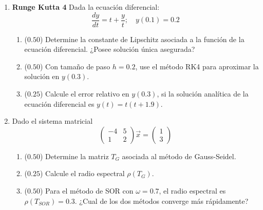 \documentclass[12pt]{article}
\begin{document}
  \begin{enumerate}[leftmargin=*,widest=9]
    \item \textbf{Runge Kutta 4} Dada la ecuación diferencial:
    \[
    \frac{dy}{dt} = t + \frac{y}{t}; \quad y(0.1)=0.2
    \]
    \begin{enumerate}[label=\alph*]
    \item ($0.50$) Determine la constante de Lipschitz asociada a la función de la ecuación diferencial. ¿Posee solución única asegurada?
    \vspace{2cm}
    
    \item ($0.50$) Con tamaño de paso \(h=0.2\), use el método RK4 para aproximar la solución en \(y(0.3)\).
    \vspace{3cm}
    
    \item ($0.25$) Calcule el error relativo en \(y(0.3)\), si la solución analítica de la ecuación diferencial es \(y(t) = t(t+1.9)\).
    \vspace{2cm}
    
    \end{enumerate}

    \item Dado el sistema matricial
    \[
    \begin{pmatrix}
    -4 & 5 \\ 1 & 2
    \end{pmatrix} \vec{x} = \begin{pmatrix}
    1 \\ 3
    \end{pmatrix}
    \]
    \begin{enumerate}[label=\alph*]
    \item ($0.50$) Determine la matriz \(T_G\) asociada al método de Gauss-Seidel.
    \vspace{2cm}
    
    \item ($0.25$) Calcule el radio espectral \(\rho(T_G)\).
    \vspace{2cm}
    
    \item ($0.50$) Para el método de SOR con \(\omega=0.7\), el radio espectral es \(\rho(T_{SOR}) = 0.3\). ¿Cual de los dos métodos converge más rápidamente?
    \vspace{1cm}
    
    \end{enumerate}
   

\end{enumerate}
\end{document}
